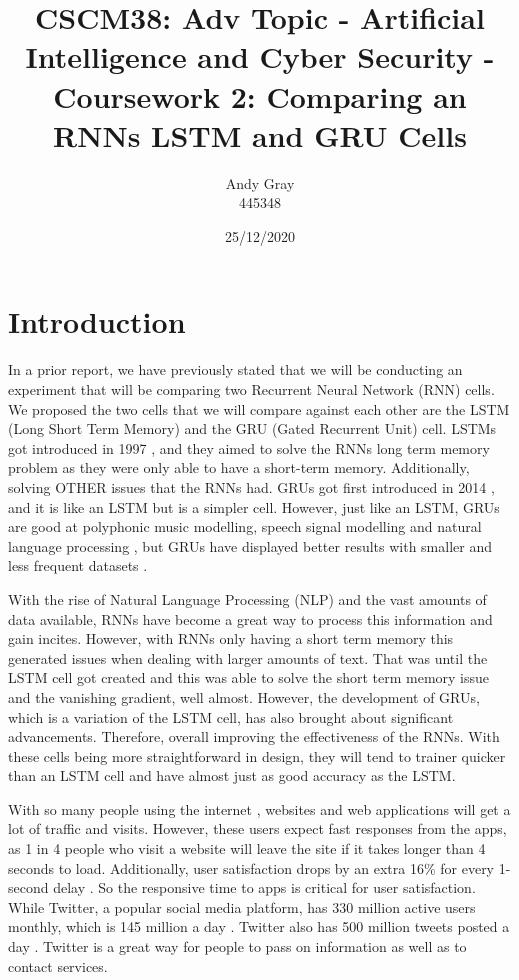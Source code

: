 \documentclass[a4paper,10pt]{article}
\begin{document}
\title{CSCM38: Adv Topic - Artificial Intelligence and Cyber Security - Coursework 2: Comparing an RNNs LSTM and GRU Cells}
\author{Andy Gray\\445348}
\date{25/12/2020}

\maketitle

\section{Introduction}
\label{sec:intro}
	In a prior report, we have previously stated that we will be conducting an experiment that will be comparing two Recurrent Neural Network (RNN) cells. We proposed the two cells that we will compare against each other are the LSTM (Long Short Term Memory) and the GRU (Gated Recurrent Unit) cell. LSTMs got introduced in 1997 \cite{hochreiter1997long}, and they aimed to solve the RNNs long term memory problem as they were only able to have a short-term memory. Additionally, solving OTHER issues that the RNNs had. GRUs got first introduced in 2014 \cite{cho2014learning}, and it is like an LSTM but is a simpler cell. However, just like an LSTM, GRUs are good at polyphonic music modelling, speech signal modelling and natural language processing \cite{geron2019hands}, but GRUs have displayed better results with smaller and less frequent datasets \cite{chung2014empirical}.

	With the rise of Natural Language Processing (NLP) and the vast amounts of data available, RNNs have become a great way to process this information and gain incites. However, with RNNs only having a short term memory this generated issues when dealing with larger amounts of text. That was until the LSTM cell got created and this was able to solve the short term memory issue and the vanishing gradient, well almost. However, the development of GRUs, which is a variation of the LSTM cell, has also brought about significant advancements. Therefore, overall improving the effectiveness of the RNNs. With these cells being more straightforward in design, they will tend to trainer quicker than an LSTM cell and have almost just as good accuracy as the LSTM.  

	With so many people using the internet \cite{internet_facts}, websites and web applications will get a lot of traffic and visits. However, these users expect fast responses from the apps, as 1 in 4 people who visit a website will leave the site if it takes longer than 4 seconds to load. Additionally, user satisfaction drops by an extra 16\% for every 1-second delay \cite{internet_speed}. So the responsive time to apps is critical for user satisfaction. While Twitter, a popular social media platform, has 330 million active users monthly, which is 145 million a day \cite{twitter_facts}.  Twitter also has 500 million tweets posted a day \cite{twitter_facts}. Twitter is a great way for people to pass on information as well as to contact services.
	
\end{document}
